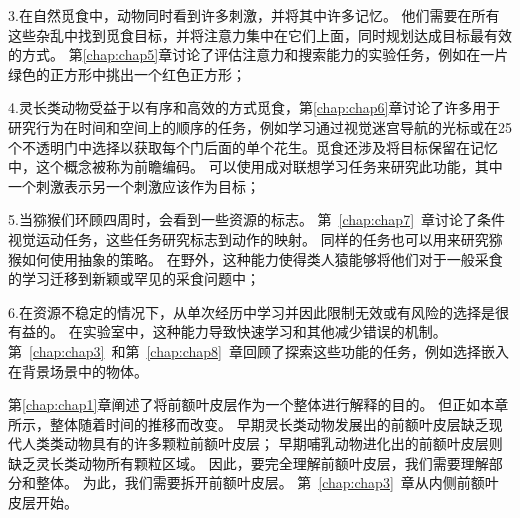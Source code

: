 3.在自然觅食中，动物同时看到许多刺激，并将其中许多记忆。
他们需要在所有这些杂乱中找到觅食目标，并将注意力集中在它们上面，同时规划达成目标最有效的方式。
第\ref{chap:chap5}章讨论了评估注意力和搜索能力的实验任务，例如在一片绿色的正方形中挑出一个红色正方形；\par


4.灵长类动物受益于以有序和高效的方式觅食，第\ref{chap:chap6}章讨论了许多用于研究行为在时间和空间上的顺序的任务，例如学习通过视觉迷宫导航的光标或在25个不透明门中选择以获取每个门后面的单个花生。觅食还涉及将目标保留在记忆中，这个概念被称为前瞻编码。
可以使用成对联想学习任务来研究此功能，其中一个刺激表示另一个刺激应该作为目标；\par


5.当猕猴们环顾四周时，会看到一些资源的标志。
第~\ref{chap:chap7}~章讨论了条件视觉运动任务，这些任务研究标志到动作的映射。
同样的任务也可以用来研究猕猴如何使用抽象的策略。
在野外，这种能力使得类人猿能够将他们对于一般采食的学习迁移到新颖或罕见的采食问题中；\par


6.在资源不稳定的情况下，从单次经历中学习并因此限制无效或有风险的选择是很有益的。
在实验室中，这种能力导致快速学习和其他减少错误的机制。
第~\ref{chap:chap3}~和第~\ref{chap:chap8}~章回顾了探索这些功能的任务，例如选择嵌入在背景场景中的物体。


第\ref{chap:chap1}章阐述了将前额叶皮层作为一个整体进行解释的目的。
但正如本章所示，整体随着时间的推移而改变。
早期灵长类动物发展出的前额叶皮层缺乏现代人类类动物具有的许多颗粒前额叶皮层；
早期哺乳动物进化出的前额叶皮层则缺乏灵长类动物所有颗粒区域。
因此，要完全理解前额叶皮层，我们需要理解部分和整体。
为此，我们需要拆开前额叶皮层。
第~\ref{chap:chap3}~章从内侧前额叶皮层开始。

